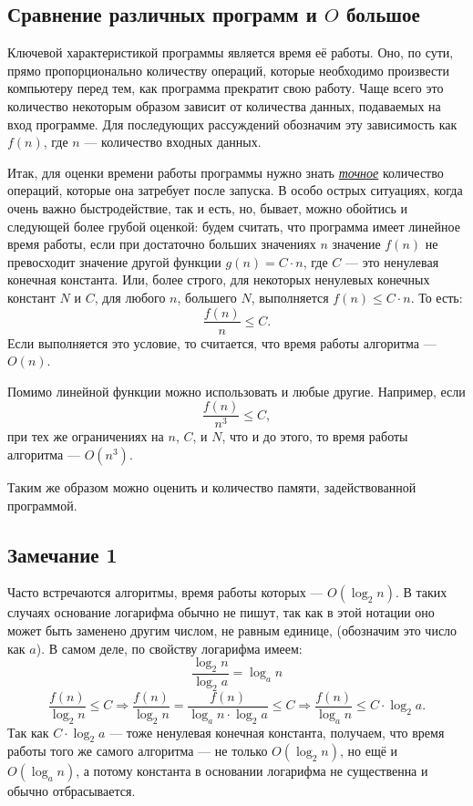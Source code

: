 \subsection{Сравнение различных программ и $O$ большое}
Ключевой характеристикой программы является время её работы. Оно, по сути, прямо пропорционально количеству операций, которые необходимо произвести компьютеру перед тем, как программа прекратит свою работу. Чаще всего это количество некоторым образом зависит от количества данных, подаваемых на вход программе. Для последующих рассуждений обозначим эту зависимость как $f(n)$, где $n$ --- количество входных данных.

Итак, для оценки времени работы программы нужно знать \underline{\emph{точное}} количество операций, которые она затребует после запуска. В особо острых ситуациях, когда очень важно быстродействие, так и есть, но, бывает, можно обойтись и следующей более грубой оценкой: будем считать, что программа имеет линейное время работы, если при достаточно больших значениях $n$ значение $f(n)$ не превосходит значение другой функции $g(n) = C \cdot n$, где $C$ --- это ненулевая конечная константа. Или, более строго, для некоторых ненулевых конечных констант $N$ и $C$, для любого $n$, большего $N$, выполняется $f(n) \le C \cdot n$.
То есть:
$$\frac{f(n)}{n} \le C.$$
Если выполняется это условие, то считается, что время работы алгоритма --- $O(n)$.

Помимо линейной функции можно использовать и любые другие. Например, если
$$\frac{f(n)}{n^3} \le C,$$
при тех же ограничениях на $n$, $C$, и $N$, что и до этого, то время работы алгоритма --- $O(n^3)$.

Таким же образом можно оценить и количество памяти, задействованной программой.

\subsection*{Замечание 1}
Часто встречаются алгоритмы, время работы которых --- $O(\log_2 n)$. В таких случаях основание логарифма обычно не пишут, так как в этой нотации оно может быть заменено другим числом, не равным единице, (обозначим это число как $a$). В самом деле, по свойству логарифма имеем:
$$\frac{\log_2 n}{\log_2 a} = \log_a n$$
$$\frac{f(n)}{\log_2 n} \le C \Rightarrow \frac{f(n)}{\log_2 n} = \frac{f(n)}{\log_a n \cdot \log_2 a} \le C \Rightarrow \frac{f(n)}{\log_a n} \le C \cdot \log_2 a.$$
Так как $C \cdot \log_2 a$ --- тоже ненулевая конечная константа, получаем, что время работы того же самого алгоритма --- не только $O(\log_2 n)$, но ещё и $O(\log_a n)$, а потому константа в основании логарифма не существенна и обычно отбрасывается.

